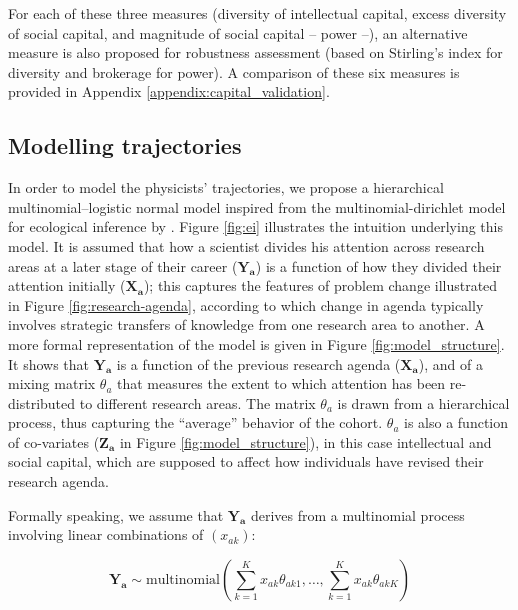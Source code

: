 \documentclass{article}
\begin{document}
For each of these three measures (diversity of intellectual capital, excess diversity of social capital, and magnitude of social capital -- power --), an alternative measure is also proposed for robustness assessment (based on Stirling's index for diversity and brokerage for power). A comparison of these six measures is provided in Appendix \ref{appendix:capital_validation}.

\subsection{\label{sec:model}Modelling trajectories}

In order to model the physicists' trajectories, we propose a hierarchical multinomial--logistic normal model inspired from the multinomial-dirichlet model for ecological inference by \citet{RosJiaKin01}. Figure \ref{fig:ei} illustrates the intuition underlying this model. It is assumed that how a scientist divides his attention across research areas at a later stage of their career ($\bm{Y_{a}}$) is a function of how they divided their attention initially ($\bm{X_{a}}$); this captures the features of problem change illustrated in Figure \ref{fig:research-agenda}, according to which change in agenda typically involves strategic transfers of knowledge from one research area to another. A more formal representation of the model is given in Figure \ref{fig:model_structure}. It shows that $\bm{Y_{a}}$ is a function of the previous research agenda ($\bm{X_{a}}$), and of a mixing matrix $\theta_a$ that measures the extent to which attention has been re-distributed to different research areas. The matrix $\theta_a$ is drawn from a hierarchical process, thus capturing the ``average'' behavior of the cohort. $\theta_a$ is also a function of co-variates ($\bm{Z_a}$ in Figure \ref{fig:model_structure}), in this case intellectual and social capital, which are supposed to affect how individuals have revised their research agenda. %

Formally speaking, we assume that $\bm{Y_{a}}$ derives from a multinomial process involving linear combinations of $(x_{ak})$:

\begin{equation}
    \bm{Y_a} \sim \text{multinomial}(\sum_{k=1}^{K} x_{ak}\theta_{ak1} ,\dots,\sum_{k=1}^{K}x_{ak}\theta_{akK})
\end{equation}
\end{document}
